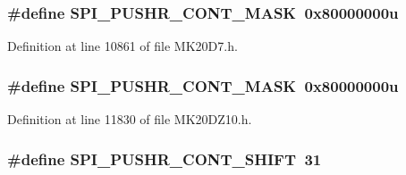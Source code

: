\subsubsection[{\texorpdfstring{S\+P\+I\+\_\+\+P\+U\+S\+H\+R\+\_\+\+C\+O\+N\+T\+\_\+\+M\+A\+SK}{SPI_PUSHR_CONT_MASK}}]{\setlength{\rightskip}{0pt plus 5cm}\#define S\+P\+I\+\_\+\+P\+U\+S\+H\+R\+\_\+\+C\+O\+N\+T\+\_\+\+M\+A\+SK~0x80000000u}\hypertarget{group___s_p_i___register___masks_gac28b0accd475a1a991ccece8d1333ae0}{}\label{group___s_p_i___register___masks_gac28b0accd475a1a991ccece8d1333ae0}


Definition at line 10861 of file M\+K20\+D7.\+h.

\subsubsection[{\texorpdfstring{S\+P\+I\+\_\+\+P\+U\+S\+H\+R\+\_\+\+C\+O\+N\+T\+\_\+\+M\+A\+SK}{SPI_PUSHR_CONT_MASK}}]{\setlength{\rightskip}{0pt plus 5cm}\#define S\+P\+I\+\_\+\+P\+U\+S\+H\+R\+\_\+\+C\+O\+N\+T\+\_\+\+M\+A\+SK~0x80000000u}\hypertarget{group___s_p_i___register___masks_gac28b0accd475a1a991ccece8d1333ae0}{}\label{group___s_p_i___register___masks_gac28b0accd475a1a991ccece8d1333ae0}


Definition at line 11830 of file M\+K20\+D\+Z10.\+h.

\subsubsection[{\texorpdfstring{S\+P\+I\+\_\+\+P\+U\+S\+H\+R\+\_\+\+C\+O\+N\+T\+\_\+\+S\+H\+I\+FT}{SPI_PUSHR_CONT_SHIFT}}]{\setlength{\rightskip}{0pt plus 5cm}\#define S\+P\+I\+\_\+\+P\+U\+S\+H\+R\+\_\+\+C\+O\+N\+T\+\_\+\+S\+H\+I\+FT~31}\hypertarget{group___s_p_i___register___masks_gab114a13d8478311e8b77778d4cbd5d96}{}\label{group___s_p_i___register___masks_gab114a13d8478311e8b77778d4cbd5d96}


